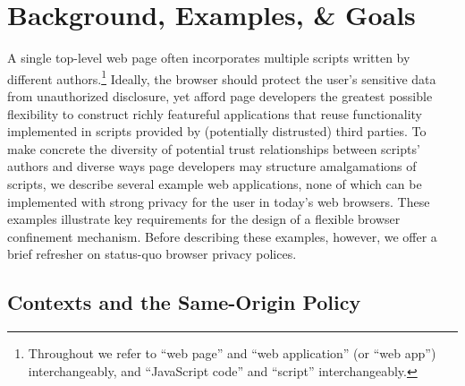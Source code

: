 \section{Background, Examples, \& Goals}

A single top-level web page often incorporates multiple scripts
written by different authors.\footnote{Throughout we refer to ``web
  page'' and ``web application'' (or ``web app'') interchangeably, and
  ``JavaScript code'' and ``script'' interchangeably.} Ideally, the
browser should protect the user's sensitive data from unauthorized
disclosure, yet afford page developers the greatest possible
flexibility to construct richly featureful applications that reuse
functionality implemented in scripts provided by (potentially
distrusted) third parties. To make concrete the diversity of potential
trust relationships between scripts' authors and diverse ways page
developers may structure amalgamations of scripts, we describe several
example web applications, none of which can be implemented with strong
privacy for the user in today's web browsers. These examples
illustrate key requirements for the design of a flexible browser
confinement mechanism. Before describing these examples, however, we
offer a brief refresher on status-quo browser privacy polices.

\subsection{Contexts and the Same-Origin Policy}
\label{sec:backgd}


